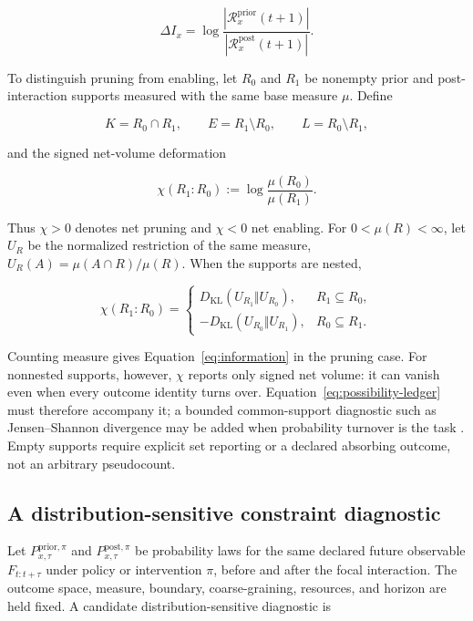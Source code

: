 \begin{equation}
\Delta I_x
=
\log\frac{|\mathcal{R}_x^{\mathrm{prior}}(t+1)|}
{|\mathcal{R}_x^{\mathrm{post}}(t+1)|}.
\label{eq:information}
\end{equation}

To distinguish pruning from enabling, let $R_0$ and $R_1$ be nonempty prior
and post-interaction supports measured with the same base measure $\mu$. Define

\begin{equation}
K=R_0\cap R_1,\qquad
E=R_1\setminus R_0,\qquad
L=R_0\setminus R_1,
\label{eq:possibility-ledger}
\end{equation}

and the signed net-volume deformation

\begin{equation}
\chi(R_1\!:\!R_0)
:=\log\frac{\mu(R_0)}{\mu(R_1)}.
\label{eq:signed-support-deformation}
\end{equation}

Thus $\chi>0$ denotes net pruning and $\chi<0$ net enabling. For
$0<\mu(R)<\infty$, let $U_R$ be the normalized restriction of the same measure,
$U_R(A)=\mu(A\cap R)/\mu(R)$. When the supports are nested,

\begin{equation}
\chi(R_1\!:\!R_0)=
\begin{cases}
D_{\mathrm{KL}}(U_{R_1}\Vert U_{R_0}), & R_1\subseteq R_0,\\[2pt]
-D_{\mathrm{KL}}(U_{R_0}\Vert U_{R_1}), & R_0\subseteq R_1.
\end{cases}
\label{eq:signed-kl-duality}
\end{equation}

Counting measure gives Equation~\ref{eq:information} in the pruning case. For
nonnested supports, however, $\chi$ reports only signed net volume: it can vanish
even when every outcome identity turns over. Equation~\ref{eq:possibility-ledger}
must therefore accompany it; a bounded common-support diagnostic such as
Jensen--Shannon divergence may be added when probability turnover is the task
\cite{lin1991divergence}. Empty supports require explicit set reporting or a
declared absorbing outcome, not an arbitrary pseudocount.

\subsection{A distribution-sensitive constraint diagnostic}

Let $P_{x,\tau}^{\mathrm{prior},\pi}$ and
$P_{x,\tau}^{\mathrm{post},\pi}$ be probability laws for the same declared
future observable $F_{t:t+\tau}$ under policy or intervention $\pi$, before and
after the focal interaction. The outcome space, measure, boundary,
coarse-graining, resources, and horizon are held fixed. A candidate
distribution-sensitive diagnostic is

